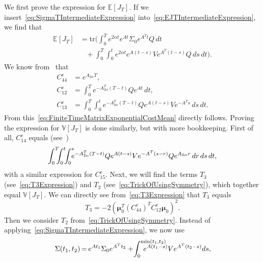 \documentclass[twocolumn]{autart}
\newcommand{\ve}[1]{{\boldsymbol{#1}}} \newcommand{\tr}{\mbox{tr}} \newcommand{\ex}{\mathds{E}} \newcommand{\va}{\mathds{V}}
\begin{document}
\begin{pf}
We first prove the expression for $\ex[J_T]$. If we insert~\eqref{eq:SigmaTIntermediateExpression} into~\eqref{eq:EJTIntermediateExpression}, we find that
\begin{align}
\ex[J_T] & = \tr\bigg(\int_0^T e^{2\alpha t} e^{A t} \Sigma_0 e^{A^T t} Q \, dt \nonumber \\
& \hspace{10pt} + \int_0^T \int_0^t e^{2\alpha t} e^{A (t-s)} V e^{A^T (t-s)} Q \, ds \, dt\bigg).
\end{align}
We know from~\cite{MatrixExponentials} that
\begin{align}
C_{44}^e & = e^{A_{2\alpha} T}, \\
C_{12}^e & = \int_0^T e^{-A_{2\alpha}^T (T-t)} Q e^{A t} \, dt, \\
C_{13}^e & = \int_0^T \int_0^t e^{-A_{2\alpha}^T (T-t)} Q e^{A (t-s)} V e^{-A^T s} \, ds \, dt.
\end{align}
From this~\eqref{eq:FiniteTimeMatrixExponentialCostMean} directly follows. Proving the expression for $\va[J_T]$ is done similarly, but with more bookkeeping. First of all, $C_{14}^e$ equals (see~\cite{MatrixExponentials})
\begin{equation}
\int_0^T \hspace{-6pt} \int_0^t \hspace{-4pt} \int_0^s \hspace{-6pt} e^{-A_{2\alpha}^T (T-t)} Q e^{A (t-s)} V e^{-A^T (s-r)} Q e^{A_{2\alpha} r} \, dr \, ds \, dt,
\end{equation}
with a similar expression for $C_{15}^e$. Next, we will find the terms $T_3$ (see~\eqref{eq:T3Expression}) and $T_2$ (see~\eqref{eq:TrickOfUsingSymmetry}), which together equal $\va[J_T]$. We can directly see from~\eqref{eq:T3Expression} that $T_3$ equals
\begin{equation}
T_3 = -2\left(\ve{\mu}_0^T (C_{44}^e)^T C_{12}^e \ve{\mu}_0\right)^2.
\end{equation}
Then we consider $T_2$ from~\eqref{eq:TrickOfUsingSymmetry}. Instead of applying~\eqref{eq:SigmaTIntermediateExpression}, we now use
\begin{equation}
\hspace{-1pt}\Sigma(t_1,t_2) \hspace{-1pt}=\hspace{-1pt} e^{A t_1} \Sigma_0 e^{A^T t_2} \hspace{-0pt}+\hspace{-2pt} \int_0^{\min(t_1,t_2)} \hspace{-34pt} e^{A (t_1 - s)} V e^{A^T (t_2 - s)} ds, \hspace{-2pt}

\end{equation}
\end{pf}
\end{document}
